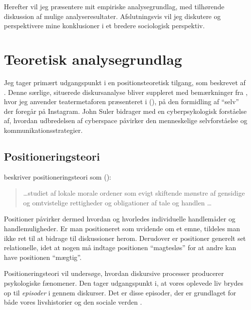 Herefter vil jeg præsentere mit empiriske analysegrundlag, med
tilhørende diskussion af mulige analyseresultater. Afslutningsvis
vil jeg diskutere og perspektivere mine konklusioner i et bredere
sociologisk perspektiv.

\section{Teoretisk analysegrundlag}

Jeg tager primært udgangspunkt i en positionsteoretisk tilgang, 
som beskrevet af \citeauthor{harrePositioningTheoryMoral1999}.   
Denne særlige, situerede diskursanalyse 
\autocite{harreRecentAdvancesPositioning2009} bliver suppleret med
bemærkninger fra 
\citeauthor{goffmanPresentationSelfEveryday1956}, hvor jeg 
anvender teatermetaforen præsenteret i 
(\citeyear{goffmanPresentationSelfEveryday1956}), på den 
formidling af “selv” der foregår på Instagram.  John Suler
bidrager med en cyberpsykologisk forståelse af, hvordan 
udbredelsen af cyberspace påvirker den menneskelige selvforståelse
og kommunikationsstrategier.

\subsection{Positioneringsteori}

\citeauthor{harrePositioningTheoryMoral1999} beskriver 
positioneringsteori som (\citeyear[s. 1, min oversættelse
]{harrePositioningTheoryMoral1999}):
\begin{quotation}
  \ldots studiet af lokale morale ordener som evigt skiftende 
  mønstre af gensidige og omtvistelige rettigheder og 
  obligationer af tale og handlen \ldots
\end{quotation}

Positioner påvirker dermed hvordan og hvorledes individuelle 
handlemåder og handlemuligheder. Er man positioneret som uvidende 
om et emne, tildeles man ikke ret til at bidrage til diskussioner 
herom. Derudover er positioner generelt set relationelle, idet at 
nogen må indtage positionen “magtesløs” for at andre kan have 
positionen “mægtig”.

Positioneringsteori vil undersøge, hvordan diskursive processer 
producerer psykologiske fænomener. Den tager udgangspunkt i, at 
vores oplevede liv brydes op til \emph{episoder} i gennem 
diskurser. Det er disse episoder, der er grundlaget for både vores
livshistorier og den sociale verden \autocite[s. 
4]{harrePositioningTheoryMoral1999}.

